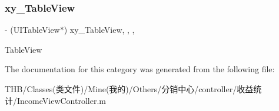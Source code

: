 \subsubsection{\texorpdfstring{xy\+\_\+\+Table\+View}{xy\_TableView}}
{\footnotesize\ttfamily -\/ (U\+I\+Table\+View$\ast$) xy\+\_\+\+Table\+View\hspace{0.3cm}{\ttfamily [read]}, {\ttfamily [write]}, {\ttfamily [nonatomic]}, {\ttfamily [strong]}}

Table\+View 

The documentation for this category was generated from the following file\+:\begin{DoxyCompactItemize}
\item 
T\+H\+B/\+Classes(类文件)/\+Mine(我的)/\+Others/分销中心/controller/收益统计/Income\+View\+Controller.\+m\end{DoxyCompactItemize}
